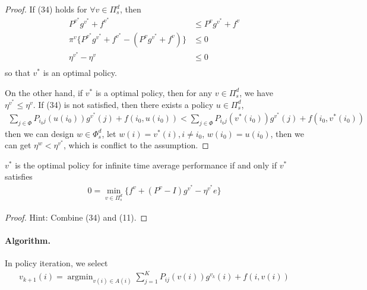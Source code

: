 \documentclass[runningheads]{llncs}
\begin{document}
    \begin{proof}
    If (34) holds for $\forall v \in \Pi_s^d$, then
    \begin{align}
        P^{v^*}g^{v^*} + f^{v^*} &\leq P^vg^{v^*} + f^v \\
        \pi^v \{P^{v^*}g^{v^*} + f^{v^*} - (P^vg^{v^*} + f^v) \} &\leq 0\\
        \eta^{v^*} - \eta^v &\leq 0\\
    \end{align}
    so that $v^*$ is an optimal policy.
    \par
    On the other hand, if $v^*$ is a optimal policy, then for any $v \in \Pi_s^d$,
    we have $\eta^{v^*} \leq \eta^v$.
    If (34) is not satisfied, then there exists a policy $u \in \Pi_s^d$,
    \begin{align}
        \sum_{j \in \Phi} P_{i_0 j} (u(i_0)) g^{v^*}(j) + f(i_0, u(i_0)) < \sum_{j \in \Phi} P_{i_0 j} (v^*(i_0)) g^{v^*}(j) + f(i_0, v^*(i_0))
    \end{align}
    then we can design $w \in \Phi_s^d$, let $w(i) = v^*(i), i \neq i_0$,
    $w(i_0) = u(i_0)$, then we can get $\eta^w < \eta^{v^*}$, which is conflict to the assumption.
    \end{proof}
    \begin{theorem}
        $v^*$ is the optimal policy for infinite time average performance
        if and only if $v^*$ satisfies
        \begin{align}
            0 = \mathop{\min}_{v \in \Pi_s^d} \{ f^v + (P^v - I)g^{v^*} - \eta^{v^*}e \}
        \end{align}
    \end{theorem}
    \begin{proof}
        Hint: Combine (34) and (11).
    \end{proof} 
    \paragraph{Algorithm.}
    In policy iteration, we select
    \begin{align}
        v_{k+1}(i) = \mathop{\arg\min}_{v(i)\in A(i)} \sum_{j=1}^K P_{ij} (v(i))g^{v_k}(i) + f(i, v(i))
    \end{align}
\end{document}
